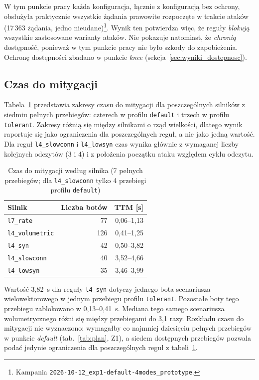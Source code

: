 \documentclass[a4paper,12pt]{article}
\begin{document}
W tym punkcie pracy każda konfiguracja, łącznie z konfiguracją bez ochrony, obsłużyła praktycznie wszystkie żądania prawowite rozpoczęte w trakcie ataków (17\,363 żądania, jedno nieudane)\footnote{\raggedright Kampania \texttt{2026-10-12\_exp1-default-4modes\_prototype}.}. Wynik ten potwierdza więc, że reguły \emph{blokują} wszystkie zastosowane warianty ataków. Nie pokazuje natomiast, że \emph{chronią} dostępność, ponieważ w tym punkcie pracy nie było szkody do zapobieżenia. Ochronę dostępności zbadano w punkcie \textit{knee} (sekcja~\ref{sec:wyniki_dostepnosc}).

\subsection{Czas do mitygacji}\label{sec:wyniki_ttm}
Tabela~\ref{tab:wyniki_ttm} przedstawia zakresy czasu do mitygacji dla poszczególnych silników z siedmiu pełnych przebiegów: czterech w profilu \texttt{default} i trzech w profilu \texttt{tolerant}. Zakresy różnią się między silnikami o rząd wielkości, dlatego wynik raportuje się jako ograniczenia dla poszczególnych reguł, a nie jako jedną wartość. Dla reguł \texttt{l4\_slowconn} i \texttt{l4\_lowsyn} czas wynika głównie z wymaganej liczby kolejnych odczytów (3 i 4) i z położenia początku ataku względem cyklu odczytu.

\begin{table}[H]
\centering
\small
\caption{Czas do mitygacji według silnika (7 pełnych przebiegów; dla \texttt{l4\_slowconn} tylko 4 przebiegi profilu \texttt{default})}\label{tab:wyniki_ttm}
\begin{tabular}{@{}lrr@{}}
\toprule
Silnik & Liczba botów & TTM [s] \\
\midrule
\texttt{l7\_rate} & 77 & 0,06--1,13 \\
\texttt{l4\_volumetric} & 126 & 0,41--1,25 \\
\texttt{l4\_syn} & 42 & 0,50--3,82 \\
\texttt{l4\_slowconn} & 40 & 3,52--4,66 \\
\texttt{l4\_lowsyn} & 35 & 3,46--3,99 \\
\bottomrule
\end{tabular}
\end{table}

Wartość 3,82~s dla reguły \texttt{l4\_syn} dotyczy jednego bota scenariusza wielowektorowego w jednym przebiegu profilu \texttt{tolerant}. Pozostałe boty tego przebiegu zablokowano w 0,13--0,41~s. Mediana tego samego scenariusza wolumetrycznego różni się między przebiegami do 3,1 razy. Rozkładu czasu do mitygacji nie wyznaczono: wymagałby co najmniej dziesięciu pełnych przebiegów w punkcie \textit{default} (tab.~\ref{tab:plan}, Z1), a siedem dostępnych przebiegów pozwala podać jedynie ograniczenia dla poszczególnych reguł z tabeli~\ref{tab:wyniki_ttm}.
\end{document}
